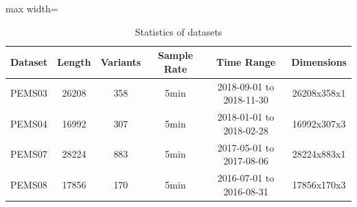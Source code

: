 \documentclass{article}
\begin{document}
\begin{table}[htbp]
\centering
\caption{Statistics of datasets}
\small
\begin{adjustbox}{max width=\textwidth}

\begin{tabular}{lccccc}
\toprule
\textbf{Dataset} & \textbf{Length} & \textbf{Variants} & \textbf{Sample Rate} & \textbf{Time Range} & \textbf{Dimensions} \\
\midrule
PEMS03 & 26208 & 358 & 5min & 2018-09-01 to 2018-11-30  & 26208x358x1 \\
PEMS04 & 16992 & 307 & 5min & 2018-01-01 to 2018-02-28  & 16992x307x3 \\
PEMS07 & 28224 & 883 & 5min & 2017-05-01 to 2017-08-06  & 28224x883x1 \\
PEMS08 & 17856 & 170 & 5min & 2016-07-01 to 2016-08-31  & 17856x170x3 \\
\bottomrule
\end{tabular}
\end{adjustbox}
\end{table}
\end{document}
